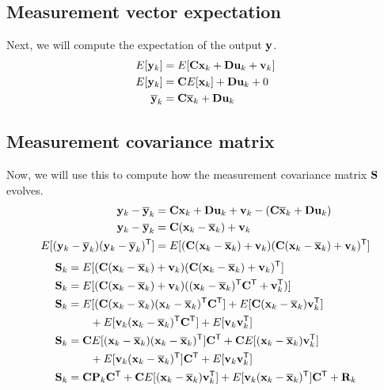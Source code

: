 \subsection{Measurement vector expectation}

Next, we will compute the expectation of the \gls{output} $\mathbf{y}$.
\begin{align*}
  E[\mathbf{y}_k] &= E[\mathbf{C}\mathbf{x}_k + \mathbf{D}\mathbf{u}_k + \mathbf{v}_k] \\
  E[\mathbf{y}_k] &= \mathbf{C}E[\mathbf{x}_k] + \mathbf{D}\mathbf{u}_k + 0 \\
  \overline{\mathbf{y}}_k &= \mathbf{C}\overline{\mathbf{x}}_k + \mathbf{D}\mathbf{u}_k
\end{align*}

\subsection{Measurement covariance matrix}

Now, we will use this to compute how the measurement covariance matrix
$\mathbf{S}$ evolves.
\begin{align*}
  \mathbf{y}_k - \overline{\mathbf{y}}_k &= \mathbf{C}\mathbf{x}_k + \mathbf{D}\mathbf{u}_k + \mathbf{v}_k -
    (\mathbf{C}\overline{\mathbf{x}}_k + \mathbf{D}\mathbf{u}_k) \\
  \mathbf{y}_k - \overline{\mathbf{y}}_k &= \mathbf{C}(\mathbf{x}_k - \overline{\mathbf{x}}_k) + \mathbf{v}_k \\
  E[(\mathbf{y}_k - \overline{\mathbf{y}}_k)(\mathbf{y}_k - \overline{\mathbf{y}}_k)^\mathsf{T}] &=
    E[(\mathbf{C}(\mathbf{x}_k - \overline{\mathbf{x}}_k) + \mathbf{v}_k)
      (\mathbf{C}(\mathbf{x}_k - \overline{\mathbf{x}}_k) + \mathbf{v}_k)^\mathsf{T}]
\end{align*}
\begin{align*}
  \mathbf{S}_k &=
    E[(\mathbf{C}(\mathbf{x}_k - \overline{\mathbf{x}}_k) + \mathbf{v}_k)
      (\mathbf{C}(\mathbf{x}_k - \overline{\mathbf{x}}_k) + \mathbf{v}_k)^\mathsf{T}] \\
  \mathbf{S}_k &=
    E[(\mathbf{C}(\mathbf{x}_k - \overline{\mathbf{x}}_k) + \mathbf{v}_k)
      ((\mathbf{x}_k - \overline{\mathbf{x}}_k)^\mathsf{T}\mathbf{C}^\mathsf{T} + \mathbf{v}_k^\mathsf{T})] \\
  \mathbf{S}_k &=
    E[(\mathbf{C}(\mathbf{x}_k - \overline{\mathbf{x}}_k)(\mathbf{x}_k - \overline{\mathbf{x}}_k)^\mathsf{T}
      \mathbf{C}^\mathsf{T}] +
    E[\mathbf{C}(\mathbf{x}_k - \overline{\mathbf{x}}_k)\mathbf{v}_k^\mathsf{T}] \\
    &\qquad + E[\mathbf{v}_k(\mathbf{x}_k - \overline{\mathbf{x}}_k)^\mathsf{T}\mathbf{C}^\mathsf{T}] +
    E[\mathbf{v}_k\mathbf{v}_k^\mathsf{T}] \\
  \mathbf{S}_k &=
    \mathbf{C}E[(\mathbf{x}_k - \overline{\mathbf{x}}_k)(\mathbf{x}_k - \overline{\mathbf{x}}_k)^\mathsf{T}]
    \mathbf{C}^\mathsf{T} + \mathbf{C}E[(\mathbf{x}_k - \overline{\mathbf{x}}_k)\mathbf{v}_k^\mathsf{T}] \\
    &\qquad + E[\mathbf{v}_k(\mathbf{x}_k - \overline{\mathbf{x}}_k)^\mathsf{T}]\mathbf{C}^\mathsf{T} +
    E[\mathbf{v}_k\mathbf{v}_k^\mathsf{T}] \\
  \mathbf{S}_k &= \mathbf{C}\mathbf{P}_k\mathbf{C}^\mathsf{T} +
    \mathbf{C}E[(\mathbf{x}_k - \overline{\mathbf{x}}_k)\mathbf{v}_k^\mathsf{T}] +
    E[\mathbf{v}_k(\mathbf{x}_k - \overline{\mathbf{x}}_k)^\mathsf{T}]\mathbf{C}^\mathsf{T} +
    \mathbf{R}_k
\end{align*}

